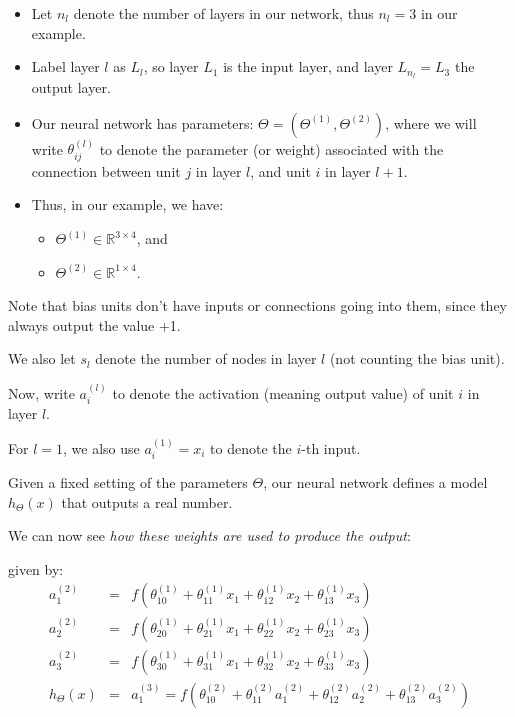 \documentclass[
  letterpaper,
  DIV=11,
  numbers=noendperiod,
  oneside]{scrartcl}
\providecommand{\tightlist}{%
  \setlength{\itemsep}{0pt}\setlength{\parskip}{0pt}}\usepackage{longtable,booktabs,array}
\begin{document}
\begin{itemize}
\item
  Let \(n_l\) denote the number of layers in our network, thus \(n_l=3\)
  in our example.
\item
  Label layer \(l\) as \(L_l\), so layer \(L_1\) is the input layer, and
  layer \(L_{n_l}=L_3\) the output layer.
\item
  Our neural network has parameters:
  \(\Theta=(\Theta^{(1)},\Theta^{(2)})\), where we will write
  \(\theta^{(l)}_{ij}\) to denote the parameter (or weight) associated
  with the connection between unit \(j\) in layer \(l\), and unit \(i\)
  in layer \(l+1\).
\item
  Thus, in our example, we have:

  \begin{itemize}
  \tightlist
  \item
    \(\Theta^{(1)}\in\mathbb{R}^{3\times 4}\), and
  \item
    \(\Theta^{(2)}\in\mathbb{R}^{1\times 4}\).
  \end{itemize}
\end{itemize}

Note that bias units don't have inputs or connections going into them,
since they always output the value +1.

We also let \(s_l\) denote the number of nodes in layer \(l\) (not
counting the bias unit).

Now, write \(a^{(l)}_i\) to denote the activation (meaning output value)
of unit \(i\) in layer \(l\).

For \(l=1\), we also use \(a^{(1)}_i=x_i\) to denote the \(i\)-th input.

Given a fixed setting of the parameters \(\Theta\), our neural network
defines a model \(h_{\Theta}(x)\) that outputs a real number.

We can now see \emph{how these weights are used to produce the output}:

given by: \begin{eqnarray}
a_1^{(2)}&=&f(\theta_{10}^{(1)}+\theta_{11}^{(1)}x_1+\theta_{12}^{(1)}x_2+\theta_{13}^{(1)}x_3)\\
a_2^{(2)}&=&f(\theta_{20}^{(1)}+\theta_{21}^{(1)}x_1+\theta_{22}^{(1)}x_2+\theta_{23}^{(1)}x_3)\\
a_3^{(2)}&=&f(\theta_{30}^{(1)}+\theta_{31}^{(1)}x_1+\theta_{32}^{(1)}x_2+\theta_{33}^{(1)}x_3)\\
h_{\Theta}(x)&=&a_1^{(3)}=f(\theta_{10}^{(2)}+\theta_{11}^{(2)}a_1^{(2)}+\theta_{12}^{(2)}a_2^{(2)}+\theta_{13}^{(2)}a_3^{(2)})
\end{eqnarray}
\end{document}
